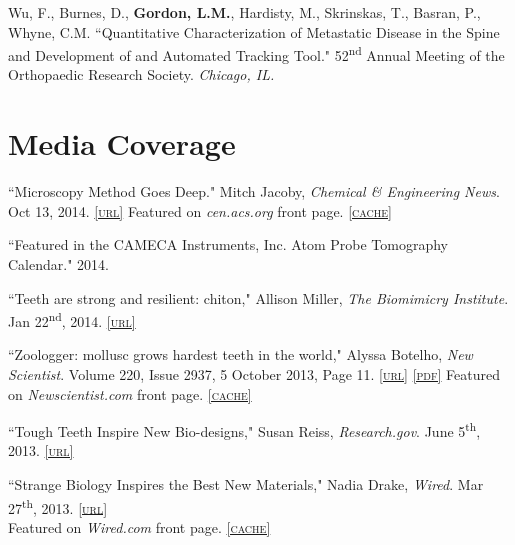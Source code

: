 Wu, F., Burnes, D., \textbf{Gordon, L.M.}, Hardisty, M., Skrinskas, T., Basran, P., Whyne, C.M. ``Quantitative Characterization of Metastatic Disease in the Spine and Development of and Automated Tracking Tool." 52\textsuperscript{nd} Annual Meeting of the Orthopaedic Research Society. \emph{Chicago, IL.}
\endgroup

\section*{Media Coverage}
``Microscopy Method Goes Deep." Mitch Jacoby, \emph{Chemical \& Engineering News}. Oct 13, 2014. \href{http://cen.acs.org/articles/92/i41/Microscopy-Method-Goes-Deep.html}{\textsc{\footnotesize{[url]}}} Featured on \emph{cen.acs.org} front page. \href{http://lylegordon.ca/chemengnews.png}{\textsc{\footnotesize{[cache]}}}
\begingroup\setlength{\parskip}{0.1cm}

``Featured in the CAMECA Instruments, Inc. Atom Probe Tomography Calendar." 2014.

``Teeth are strong and resilient: chiton," Allison Miller, \emph{The Biomimicry Institute}. Jan 22\textsuperscript{nd}, 2014. \href{http://www.asknature.org/strategy/fb5086ccd4ca1f0d5bf07e2394133877}{\textsc{\footnotesize{[url]}}} 

``Zoologger: mollusc grows hardest teeth in the world," Alyssa Botelho, \emph{New Scientist}. Volume 220, Issue 2937, 5 October 2013, Page 11. \href{http://www.newscientist.com/article/dn24329-zoologger-mollusc-grows-hardest-teeth-in-the-world.html#.Uk7GpMakpHV}{\textsc{\footnotesize{[url]}}} \href{http://lylegordon.ca/papers/NewSci2013.pdf}{\textsc{\footnotesize{[pdf]}}} Featured on \emph{Newscientist.com} front page. \href{http://lylegordon.ca/newsci.jpg}{\textsc{\footnotesize{[cache]}}}

``Tough Teeth Inspire New Bio-designs," Susan Reiss, \emph{Research.gov}. June 5\textsuperscript{th}, 2013. \href{http://www.research.gov/research-portal/appmanager/base/desktop;jsessionid=hFFMRyhFTMl4CQ76t1456YQ7LXd1RJYjQGVG1gmHP2Jcsny3ryW0!2110096251!130307470?_nfpb=true&_windowLabel=assetsInTheStates_1&_urlType=action&assetsInTheStates_1_action=selectAwardDetail&assetsInTheStates_1_id=%2FresearchGov/AwardHighlight/PublicAffairs/23492_ToughTeethInspireNewBio-designs.html}{\textsc{\footnotesize{[url]}}} 

``Strange Biology Inspires the Best New Materials," Nadia Drake, \emph{Wired}. Mar 27\textsuperscript{th}, 2013. \href{http://www.wired.com/wiredscience/2013/03/biomimetic-materials/?utm_source=feedburner&utm_medium=feed&utm_campaign=Feed%3A+wired%2Findex+%28Wired%3A+Top+Stories%29&pid=6577}{\textsc{\footnotesize{[url]}}}\\ Featured on \emph{Wired.com} front page. \href{http://lylegordon.ca/wired.jpg}{\textsc{\footnotesize{[cache]}}}

